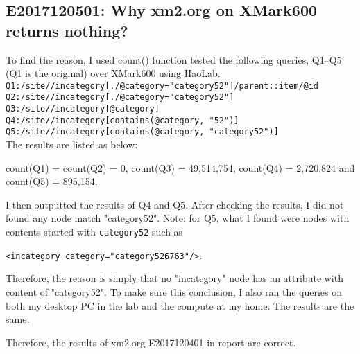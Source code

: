 
\subsection{E2017120501: Why xm2.org on XMark600 returns nothing?}

 
To find the reason, I used count() function tested the following 
queries, Q1--Q5 (Q1 is the original) over XMark600 using HaoLab.\\ 
\verb|Q1:/site//incategory[./@category="category52"]/parent::item/@id|\\
\verb|Q2:/site//incategory[./@category="category52"]|\\
\verb|Q3:/site//incategory[@category]|\\
\verb|Q4:/site//incategory[contains(@category, "52")]|\\
\verb|Q5:/site//incategory[contains(@category, "category52")]|\\

The results are listed as below:

 
count(Q1) = count(Q2) = 0, count(Q3) = 49,514,754, count(Q4) =  2,720,824 and count(Q5) = 895,154. 

I then outputted the results of Q4 and Q5. After checking the 
results, I did not found any node match "category52".
Note: for Q5, what I found were nodes with contents started with 
\texttt{category52} such as 

\verb|<incategory category="category526763"/>|. 

Therefore, the reason is simply that no "incategory" node has 
an attribute with content of "category52". To make sure this 
conclusion, I also ran the queries on both my desktop PC in the 
lab and the compute at my home. The results are the same.

Therefore, the results of xm2.org E2017120401 in report are correct.


